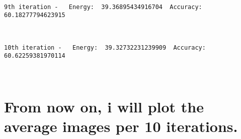 \documentclass[11pt]{article}
\begin{document}
    \begin{center}
    \end{center}
    { \hspace*{\fill} \\}
    
    \begin{Verbatim}[commandchars=\\\{\}]
9th iteration -   Energy:  39.36895434916704  Accuracy:  60.18277794623915

    \end{Verbatim}

    \begin{center}
    \end{center}
    { \hspace*{\fill} \\}
    
    \begin{Verbatim}[commandchars=\\\{\}]
10th iteration -   Energy:  39.32732231239909  Accuracy:  60.62259381970114

    \end{Verbatim}

    \begin{center}
    \end{center}
    { \hspace*{\fill} \\}
    
    \hypertarget{from-now-on-i-will-plot-the-average-images-per-10-iterations.}{%
\section{From now on, i will plot the average images per 10
iterations.}\label{from-now-on-i-will-plot-the-average-images-per-10-iterations.}}
\end{document}
